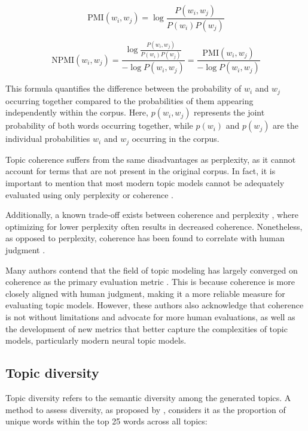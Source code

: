 \[\text{PMI}(w_i, w_j) = \log \frac{P(w_i, w_j)}{P(w_i) P(w_j)}\]

\[\text{NPMI}(w_i, w_j) = \frac{\log \frac{P(w_i, w_j)}{P(w_i) P(w_j)}}{-\log P(w_i, w_j)} = \frac{\text{PMI}(w_i, w_j)}{-\log P(w_i, w_j)}\]

This formula quantifies the difference between the probability of $w_i$ and $w_j$ occurring together compared to the probabilities of them appearing independently within the corpus. Here, $p(w_i,w_j)$ represents the joint probability of both words occurring together, while $p(w_i)$ and $p(w_j)$ are the individual probabilities $w_i$ and $w_j$ occurring in the corpus.

Topic coherence suffers from the same disadvantages as perplexity, as it cannot account for terms that are not present in the original corpus. In fact, it is important to mention that most modern topic models cannot be adequately evaluated using only perplexity or coherence \cite{doogan_topic_2021, hoyle_is_2021}.

Additionally, a known trade-off exists between coherence and perplexity \cite{chang_reading_2009}, where optimizing for lower perplexity often results in decreased coherence. Nonetheless, as opposed to perplexity, coherence has been found to correlate with human judgment \cite{doogan_topic_2021, hoyle_is_2021, lee_human_2017, newman_evaluating_2010, mimno_optimizing_nodate, lau_machine_2014}.

Many authors contend that the field of topic modeling has largely converged on coherence as the primary evaluation metric \cite{doogan_topic_2021, hoyle_is_2021, mimno_optimizing_nodate, lau_machine_2014}. This is because coherence is more closely aligned with human judgment, making it a more reliable measure for evaluating topic models. However, these authors also acknowledge that coherence is not without limitations and advocate for more human evaluations, as well as the development of new metrics that better capture the complexities of topic models, particularly modern neural topic models.

\subsection{Topic diversity}
\label{sec:topic_diversity}
Topic diversity refers to the semantic diversity among the generated topics. A method to assess diversity, as proposed by \citet{dieng_topic_2020}, considers it as the proportion of unique words within the top 25 words across all topics:

